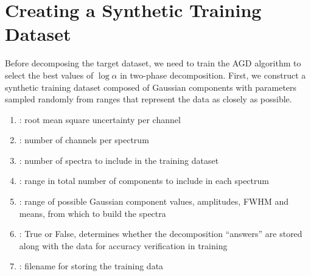 \documentclass[letterpaper,10pt,openany,oneside]{sphinxmanual}
\begin{document}
\section{Creating a Synthetic Training Dataset}
\label{dataprep:creating-a-synthetic-training-dataset}
Before decomposing the target dataset, we need to train the AGD algorithm to
select the best values of \(\log\alpha\) in two-phase decomposition. First, we
construct a synthetic training dataset composed of Gaussian components with
parameters sampled randomly from ranges that represent the data as closely as
possible.
\begin{enumerate}
\item {} 
: root mean square uncertainty per channel

\item {} 
: number of channels per spectrum

\item {} 
: number of spectra to include in the training dataset

\item {} 
: range in total number of components to include in each
spectrum

\item {} 
: range of possible Gaussian component
values, amplitudes, FWHM and means, from which to build the spectra

\item {} 
 : True or False, determines whether the decomposition
``answers'' are stored along with the data for accuracy verification in
training

\item {} 
 : filename for storing the training data

\end{enumerate}
\end{document}
